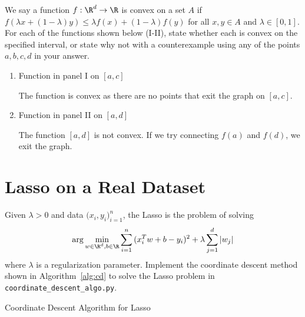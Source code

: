 \documentclass{article}
\begin{document}
\begin{aprob}
     We say a function $f: \R^d \rightarrow \R$ is convex on a set $A$ if $f(\lambda x + (1-\lambda) y) \leq \lambda f(x) + (1-\lambda) f(y)$ for all $x,y\in A$ and $\lambda \in [0,1]$. For each of the functions shown below (I-II), state whether each is convex on the specified interval, or state why not with a counterexample using any of the points $a,b,c,d$ in your answer.

    \begin{enumerate}
        \item Function in panel I on $[a,c]$

The function is convex as there are no points that exit the graph on $[a,c]$.

        \item Function in panel II on $[a,d]$
        
The function $[a,d]$ is not convex. If we try connecting $f(a)$ and $f(d)$, we exit the graph. 

    \end{enumerate}

\end{aprob}

\newpage
\section*{Lasso on a Real Dataset}
Given $\lambda >0$ and data $\Big (x_i,y_i \Big)_{i=1}^n$, the Lasso is the problem of solving
\begin{equation*}\label{eq:lasso}
  \arg\min_{{w}\in \R^d, b \in \R} \sum_{i=1}^n { (x_i^T {w} + b - {y}_i)^2 }
    + \lambda \sum_{j=1}^d |{w}_j| 
\end{equation*}
where $\lambda$ is a regularization parameter. Implement the coordinate descent method shown in Algorithm~\ref{alg:cd} to solve the Lasso problem in \texttt{coordinate\_descent\_algo.py}. 

\begin{algorithm}[h]
    \caption{Coordinate Descent Algorithm for Lasso}\label{alg:cd}
\end{algorithm}
\end{document}
